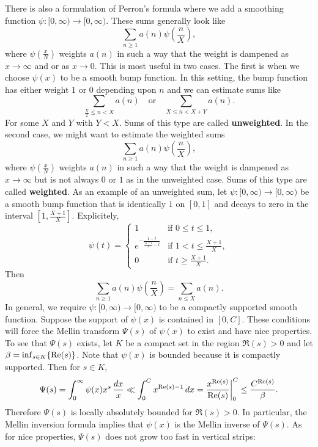       There is also a formulation of Perron's formula where we add a smoothing function $\psi:[0,\infty) \to [0,\infty)$. These sums generally look like
      \[
        \sum_{n \ge 1}a(n)\psi\left(\frac{n}{X}\right),
      \]
      where $\psi\left(\frac{x}{N}\right)$ weights $a(n)$ in such a way that the weight is dampened as $x \to \infty$ and or as $x \to 0$. This is most useful in two cases. The first is when we choose $\psi(x)$ to be a smooth bump function. In this setting, the bump function has either weight $1$ or $0$ depending upon $n$ and we can estimate sums like
      \[
        \sum_{\frac{X}{2} \le n < X}a(n) \quad \text{or} \quad \sum_{X \le n < X+Y}a(n).
      \]
      For some $X$ and $Y$ with $Y < X$. Sums of this type are called \textbf{unweighted}. In the second case, we might want to estimate the weighted sums
      \[
        \sum_{n \ge 1}a(n)\psi\left(\frac{n}{X}\right),
      \]
      where $\psi\left(\frac{x}{N}\right)$ weights $a(n)$ in such a way that the weight is dampened as $x \to \infty$ but is not always $0$ or $1$ as in the unweighted case. Sums of this type are called \textbf{weighted}. As an example of an unweighted sum, let $\psi:[0,\infty) \to [0,\infty)$ be a smooth bump function that is identically $1$ on $[0,1]$ and decays to zero in the interval $\left[1,\frac{X+1}{X}\right]$. Explicitely,
      \[
          \psi(t) = \begin{cases} 1 & \text{if $0 \le t \le 1$}, \\ e^{-\frac{1-t}{\frac{X+1}{X}-t}} & \text{if $1 < t \le \frac{X+1}{X}$}, \\ 0 & \text{if $t \ge \frac{X+1}{X}$}. \end{cases}
      \]
      Then 
      \[
        \sum_{n \ge 1}a(n)\psi\left(\frac{n}{X}\right) = \sum_{n \le X}a(n).
      \]
      In general, we require $\psi:[0,\infty) \to [0,\infty)$ to be a compactly supported smooth function. Suppose the support of $\psi(x)$ is contained in $[0,C]$. These conditions will force the Mellin transform $\Psi(s)$ of $\psi(x)$ to exist and have nice properties. To see that $\Psi(s)$ exists, let $K$ be a compact set in the region $\Re(s) > 0$ and let $\beta = \inf_{s \in K}\{\mathrm{Re}(s)\}$. Note that $\psi(x)$ is bounded because it is compactly supported. Then for $s \in K$,
      \[
        \Psi(s) = \int_{0}^{\infty}\psi(x)x^{s}\,\frac{dx}{x} \ll \int_{0}^{C}x^{\mathrm{Re}(s)-1}\,dx = \frac{x^{\mathrm{Re}(s)}}{\mathrm{Re}(s)}\bigg|_{0}^{C} \le \frac{C^{\mathrm{Re}(s)}}{\beta}.
      \]
      Therefore $\Psi(s)$ is locally absolutely bounded for $\Re(s) > 0$. In particular, the Mellin inversion formula implies that $\psi(x)$ is the Mellin inverse of $\Psi(s)$. As for nice properties, $\Psi(s)$ does not grow too fast in vertical strips:


